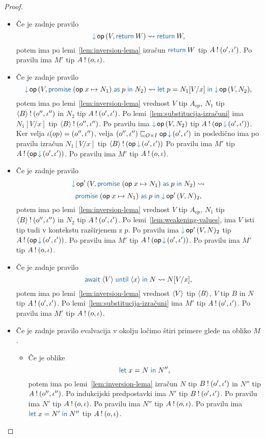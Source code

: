 \begin{proof}
\begin{itemize}
		\item Če je zadnje pravilo $$\tmopin{op}{V}{\tmreturn W} \reduces \tmreturn W,$$ potem ima po lemi~\ref{lem:inversion-lema} izračun $\tmreturn{W}$ tip $A \mathbin{!} (o', \iota')$.
		Po pravilu  ima $M'$ tip $A \mathbin{!} (o, \iota)$.
		
		\item Če je zadnje pravilo $$\tmopin{op}{V}{\tmwith{op}{x}{N_1}{p}{N_2}} \reduces \tmlet{p}{N_1[V/x]}{\tmopin{op}{V}{N_2}},$$ potem ima po lemi~\ref{lem:inversion-lema} vrednost $V$ tip $A_{op}$, $N_1$ tip $\langle B \rangle \mathbin{!} (o'', \iota'')$ in $N_2$ tip $A \mathbin{!} (o', \iota')$.
		Po lemi~\ref{lem:substitucija-izračuni} ima $N_1[V/x]$ tip $\langle B \rangle \mathbin{!} (o'', \iota'')$.
		Po pravilu  ima $\tmopin{op}{V}{N_2}$ tip $\tycomp{A}{\opincomp{op}{(\o', \i')}}$.
		Ker velja $\iota(op) = (o'', \iota'')$, velja $(\o'', \i'') \order{O \times I} \opincomp{op}{(\o', \i')}$ in posledično ima po pravilu  izračun $N_1[V/x]$ tip $\tycomp{\typromise{B}}{\opincomp{op}{(\o', \i')}}$
		Po pravilu  ima $M'$ tip $\tycomp{A}{\opincomp{op}{(\o', \i')}}$.
		Po pravilu  ima $M'$ tip $A \mathbin{!} (o, \iota)$.
		
		\item Če je zadnje pravilo $$\tmopin{op'}{V}{\tmwith{op}{x}{N_1}{p}{N_2}} \reduces$$ $$ \tmwith{op}{x}{N_1}{p}{\tmopin{op'}{V}{N}_2},$$ potem ima po lemi~\ref{lem:inversion-lema} vrednost $V$ tip $A_{op}$, $N_1$ tip $\langle B \rangle \mathbin{!} (o'', \iota'')$ in $N_2$ tip $A \mathbin{!} (o', \iota')$.
		Po lemi~\ref{lem:weakening-values}, ima $V$ isti tip tudi v kontekstu razširjenem z $p$.
		Po pravilu  ima $\tmopin{op'}{V}{N}_2$ tip $\tycomp{A}{\opincomp{op}{(\o', \i')}}$.
		Po pravilu  ima $M'$ tip $\tycomp{A}{\opincomp{op}{(\o', \i')}}$.
		Po pravilu  ima $M'$ tip $A \mathbin{!} (o, \iota)$.
		
		\item Če je zadnje pravilo $$\tmawait{\tmpromise V}{x}{N} \reduces N[V/x],$$ potem ima po lemi~\ref{lem:inversion-lema} vrednost $\langle V \rangle$ tip $\langle B \rangle$, $V$ tip $B$ in $N$ tip $A \mathbin{!} (o', \iota')$.
		Po lemi~\ref{lem:substitucija-izračuni} ima $M'$ tip $A \mathbin{!} (o', \iota')$.
		Po pravilu  ima $M'$ tip $A \mathbin{!} (o, \iota)$.
		
		\item Če je zadnje pravilo evalvacija v okolju ločimo štiri primere glede na obliko $M$.
		\begin{itemize}
			\item Če je oblike $$\tmlet{x}{N}{N''},$$ potem ima po lemi~\ref{lem:inversion-lema} izračun $N$ tip $B \mathbin{!} (o', \iota')$ in $N''$ tip $A \mathbin{!} (o'', \iota'')$.
			Po indukcijski predpostavki ima $N'$ tip $B \mathbin{!} (o', \iota')$.
			Po pravilu  ima $N'$ tip $A \mathbin{!} (o, \iota)$.
			Po pravilu  ima $N''$ tip $A \mathbin{!} (o, \iota)$.
			Po pravilu  ima $\tmlet{x}{N'}{N''}$ tip $A \mathbin{!} (o, \iota)$.
			

\end{itemize}
\end{itemize}
\end{proof}
